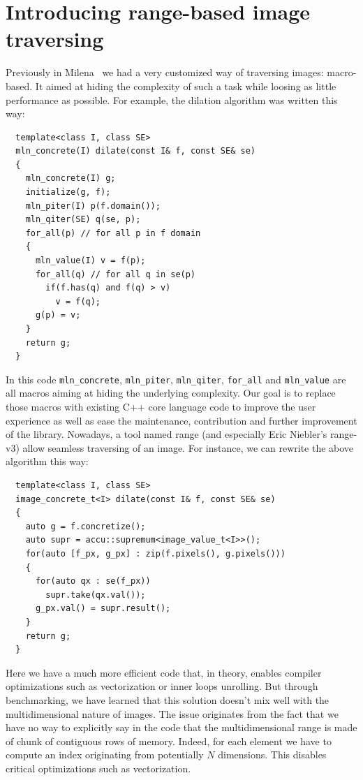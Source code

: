 \section{Introducing range-based image traversing}
\label{sec.range.traversing}

Previously in Milena~\cite{levillain.2009.ismm} we had a very customized way of traversing images: macro-based. It aimed
at hiding the complexity of such a task while loosing as little performance as possible. For example, the dilation
algorithm was written this way:

\begin{verbatim}
  template<class I, class SE>
  mln_concrete(I) dilate(const I& f, const SE& se)
  {
    mln_concrete(I) g;
    initialize(g, f);
    mln_piter(I) p(f.domain());
    mln_qiter(SE) q(se, p);
    for_all(p) // for all p in f domain
    {
      mln_value(I) v = f(p);
      for_all(q) // for all q in se(p)
        if(f.has(q) and f(q) > v)
          v = f(q);
      g(p) = v;
    }
    return g;
  }
\end{verbatim}

In this code \texttt{mln\_concrete}, \texttt{mln\_piter}, \texttt{mln\_qiter}, \texttt{for\_all} and \texttt{mln\_value}
are all macros aiming at hiding the underlying complexity. Our goal is to replace those macros with existing C++ core
language code to improve the user experience as well as ease the maintenance, contribution and further improvement of
the library. Nowadays, a tool named range (and especially Eric Niebler's range-v3) allow seamless traversing of an
image. For instance, we can rewrite the above algorithm this way:

\begin{verbatim}
  template<class I, class SE>
  image_concrete_t<I> dilate(const I& f, const SE& se)
  {
    auto g = f.concretize();
    auto supr = accu::supremum<image_value_t<I>>();
    for(auto [f_px, g_px] : zip(f.pixels(), g.pixels()))
    {
      for(auto qx : se(f_px))
        supr.take(qx.val());
      g_px.val() = supr.result();
    }
    return g;
  }
\end{verbatim}

Here we have a much more efficient code that, in theory, enables compiler optimizations such as vectorization or inner
loops unrolling. But through benchmarking, we have learned that this solution doesn't mix well with the multidimensional
nature of images. The issue originates from the fact that we have no way to explicitly say in the code that the
multidimensional range is made of chunk of contiguous rows of memory. Indeed, for each element we have to compute an
index originating from potentially $N$ dimensions. This disables critical optimizations such as vectorization.


